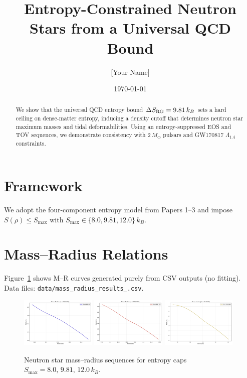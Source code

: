 \documentclass[11pt]{article}
\title{Entropy-Constrained Neutron Stars from a Universal QCD Bound}
\author{[Your Name]}
\date{\today}
\begin{document}
\maketitle

\begin{abstract}
We show that the universal QCD entropy bound $\Delta S_{\rm RG}=9.81\,k_B$ sets a hard ceiling on dense-matter entropy, inducing a density cutoff that determines neutron star maximum masses and tidal deformabilities. Using an entropy-suppressed EOS and TOV sequences, we demonstrate consistency with $2\,M_\odot$ pulsars and GW170817 $\Lambda_{1.4}$ constraints.
\end{abstract}

\section{Framework}
We adopt the four-component entropy model from Papers 1–3 and impose $S(\rho)\le S_{\max}$ with $S_{\max}\in\{8.0,9.81,12.0\}\,k_B$.

\section{Mass–Radius Relations}
Figure~\ref{fig:mr_all} shows M–R curves generated purely from CSV outputs (no fitting). Data files: \texttt{data/mass_radius\_results\_\*.csv}.

\begin{figure}[h!]
\centering
\includegraphics[width=0.32\textwidth]{../figures/mass_radius_curve_08.00kB.png}
\includegraphics[width=0.32\textwidth]{../figures/mass_radius_curve_09.81kB.png}
\includegraphics[width=0.32\textwidth]{../figures/mass_radius_curve_12.00kB.png}
\caption{Neutron star mass–radius sequences for entropy caps $S_{\max}=8.0,\,9.81,\,12.0\,k_B$.}
\label{fig:mr_all}
\end{figure}
\end{document}
